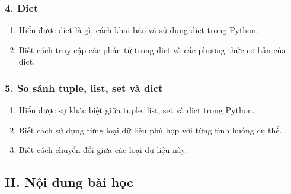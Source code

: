 \subsubsection*{4. Dict}
\begin{enumerate}[label=\alph*.]
    \item Hiểu được dict là gì, cách khai báo và sử dụng dict trong Python.
    \item Biết cách truy cập các phần tử trong dict và các phương thức cơ bản của dict.
\end{enumerate}
\subsubsection*{5. So sánh tuple, list, set và dict}
\begin{enumerate}[label=\alph*.]
    \item Hiểu được sự khác biệt giữa tuple, list, set và dict trong Python.
    \item Biết cách sử dụng từng loại dữ liệu phù hợp với từng tình huống cụ thể.
    \item Biết cách chuyển đổi giữa các loại dữ liệu này.
\end{enumerate}
\subsection*{II. Nội dung bài học}
